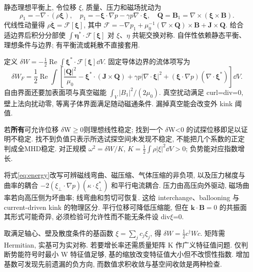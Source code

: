 \label{ch:energy}
静态理想平衡上, 令位移 \ensuremath{\xi}, 质量、压力和磁场扰动为
\begin{equation}
 \rho_1=-\nabla\cdot(\rho\boldsymbol\xi),\quad
 p_1=-\boldsymbol\xi\cdot\nabla p-\gamma p\nabla\cdot\boldsymbol\xi,\quad
 \mathbf Q=\mathbf B_1=\nabla\times(\boldsymbol\xi\times\mathbf B).
\end{equation}
代线性动量得 $\rho\ddot{\boldsymbol\xi}=\mathcal F[\boldsymbol\xi]$, 其中
$\mathcal F=-\nabla p_1+\mu_0^{-1}(\nabla\times\mathbf Q)\times\mathbf B+\mathbf J\times\mathbf Q$.
给合适边界后积分分部使 $\int\boldsymbol\eta^*\cdot\mathcal F[\boldsymbol\xi]$ 对 \ensuremath{\xi}、\ensuremath{\eta} 共轭交换对称. 自伴性依赖静态平衡、理想条件与边界; 有平衡流或耗散不直接套用.

定义 $\delta W=-\tfrac12\operatorname{Re}\int\boldsymbol\xi^*\cdot\mathcal F[\boldsymbol\xi]\dd V$. 固定导体边界的流体项写为
\begin{equation}\label{eq:energy}
 \delta W_F=\frac12\operatorname{Re}\int\left[
 \frac{|\mathbf Q|^2}{\mu_0}-\boldsymbol\xi^*\cdot(\mathbf J\times\mathbf Q)
 +\gamma p|\nabla\cdot\boldsymbol\xi|^2
 +(\boldsymbol\xi\cdot\nabla p)(\nabla\cdot\boldsymbol\xi^*)\right]\dd V.
\end{equation}
自由界面还要加表面项与真空磁能 $\int_V|B_1|^2/(2\mu_0)$. 真空扰动满足 curl=div=0, 壁上法向扰动零, 等离子体界面满足随动磁通条件. 漏掉真空能会改变外 kink 阈值.

若\textbf{所有}可允许位移 \ensuremath{\delta}W\ensuremath{\ge}0则理想线性稳定; 找到一个 \ensuremath{\delta}W<0 的试探位移即足以证明不稳定. 找不到负值只表示所选试探空间未发现不稳定, 不能把几个系数的正定判成全MHD稳定. 对正规模 $\omega^2=\delta W/K$, $K=\tfrac12\int\rho|\xi|^2\dd V>0$; 负势能对应指数增长.

将式\eqref{eq:energy}改写可辨磁线弯曲、磁压缩、气体压缩的非负项, 以及压力梯度与曲率的耦合 $-2(\xi_\perp\cdot\nabla p)(\kappa\cdot\xi_\perp^*)$ 和平行电流耦合. 压力由高压向外驱动, 磁场曲率若向高压侧为坏曲率; 线弯曲和剪切可恢复. 这给 interchange、ballooning 与 current-driven kink 的物理区分. 平行位移可降低压缩能, 但在 $\mathbf k\cdot\mathbf B=0$ 的共振面其形式可能奇异, 必须检验可允许性而不能无条件设 div\ensuremath{\xi}=0.

取满足轴心、壁及散度条件的基函数 $\xi=\sum_jc_j\xi_j$, 得 $\delta W=\tfrac12c^\dagger Wc$. 矩阵需 Hermitian, 实基可为实对称. 若要增长率还需质量矩阵 K 作广义特征值问题. 仅判断势能符号时最小 W 特征值足够, 基的缩放改变特征值大小但不改惯性指数. 增加基数可发现先前遗漏的负方向, 而数值求积收敛与基空间收敛是两种检查.

